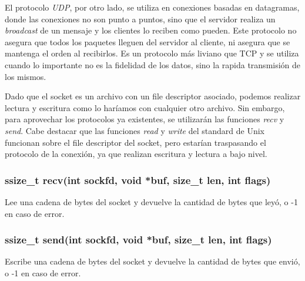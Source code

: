 \documentclass[a4paper, twoside]{article}
\begin{document}
El protocolo \emph{UDP}, por otro lado, se utiliza en conexiones basadas en datagramas, donde las conexiones no son punto a puntos, sino que el servidor realiza un \emph{broadcast} de un mensaje y los clientes lo reciben como pueden. Este protocolo no asegura que todos los paquetes lleguen del servidor al cliente, ni asegura que se mantenga el orden al recibirlos. Es un protocolo más liviano que TCP y se utiliza cuando lo importante no es la fidelidad de los datos, sino la rapida transmisión de los mismos.

Dado que el socket es un archivo con un file descriptor asociado, podemos realizar lectura y escritura como lo haríamos con cualquier otro archivo. Sin embargo, para aprovechar los protocolos ya existentes, se utilizarán las funciones \emph{recv} y \emph{send}. Cabe destacar que las funciones \emph{read} y \emph{write} del standard de Unix funcionan sobre el file descriptor del socket, pero estarían traspasando el protocolo de la conexión, ya que realizan escritura y lectura a bajo nivel.

\subsubsection{ssize\_t recv(int sockfd, void *buf, size\_t len, int flags)}
Lee una cadena de bytes del socket y devuelve la cantidad de bytes que leyó, o -1 en caso de error.


\subsubsection{ssize\_t send(int sockfd, void *buf, size\_t len, int flags)}
Escribe una cadena de bytes del socket y devuelve la cantidad de bytes que envió, o -1 en caso de error.
\end{document}
